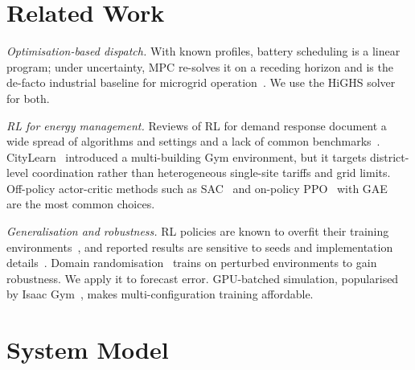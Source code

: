 \documentclass[conference]{IEEEtran}
\begin{document}
\section{Related Work}

\textit{Optimisation-based dispatch.} With known profiles, battery scheduling is
a linear program; under uncertainty, MPC re-solves it on a receding horizon and
is the de-facto industrial baseline for microgrid operation~\cite{parisio2014mpc}.
We use the HiGHS solver~\cite{huangfu2018highs} for both.

\textit{RL for energy management.} Reviews of RL for demand response
document a wide spread of algorithms and settings and a lack of common
benchmarks~\cite{vazquez2019review}. CityLearn~\cite{vazquez2019citylearn}
introduced a multi-building Gym environment, but it targets district-level
coordination rather than heterogeneous single-site tariffs and grid limits.
Off-policy actor-critic methods such as SAC~\cite{haarnoja2018sac} and on-policy
PPO~\cite{schulman2017ppo} with GAE~\cite{schulman2016gae} are the most common choices.

\textit{Generalisation and robustness.} RL policies are known to overfit their
training environments~\cite{cobbe2019quantifying}, and reported results are
sensitive to seeds and implementation details~\cite{henderson2018matters}.
Domain randomisation~\cite{tobin2017domain} trains on perturbed environments to
gain robustness. We apply it to forecast error. GPU-batched simulation, popularised
by Isaac Gym~\cite{makoviychuk2021isaac}, makes multi-configuration training affordable.

\section{System Model}
\end{document}

